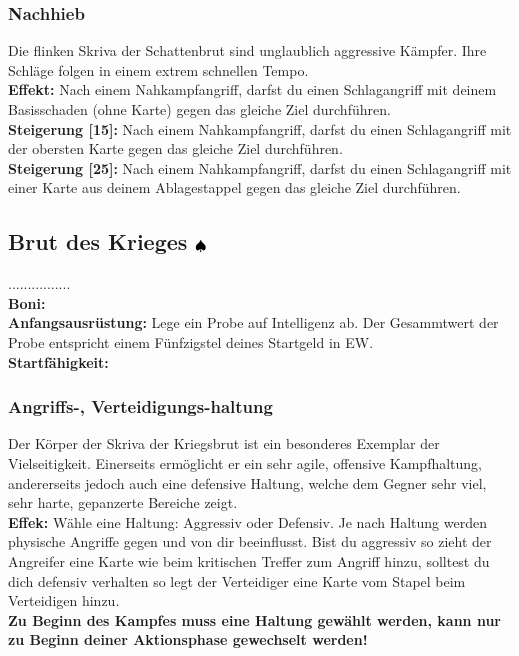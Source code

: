 \subsubsection*{Nachhieb} \label{sk:nachhieb}
Die flinken Skriva der Schattenbrut sind unglaublich aggressive Kämpfer. Ihre Schläge folgen in einem extrem schnellen Tempo. \\
\textbf{Effekt:} Nach einem Nahkampfangriff, darfst du einen Schlagangriff mit deinem Basisschaden (ohne Karte) gegen das gleiche Ziel durchführen.\\
\textbf{Steigerung [15]:} Nach einem Nahkampfangriff, darfst du einen Schlagangriff mit der obersten Karte gegen das gleiche Ziel durchführen.\\
\textbf{Steigerung [25]:} Nach einem Nahkampfangriff, darfst du einen Schlagangriff mit einer Karte aus deinem Ablagestappel gegen das gleiche Ziel durchführen.


\subsection*{Brut des Krieges ${\color{blue} }{\color{black}\spadesuit}$}
................\\
\textbf{Boni:} \\
\textbf{Anfangsausrüstung:} Lege ein Probe auf Intelligenz ab. Der Gesammtwert der Probe entspricht einem Fünfzigstel deines Startgeld in EW.\\
\textbf{Startfähigkeit:}  \\

\subsubsection*{Angriffs-, Verteidigungs-haltung} \label{sk:angriff_verteitigungs_haltung}
Der Körper der Skriva der Kriegsbrut ist ein besonderes Exemplar der Vielseitigkeit. Einerseits ermöglicht er ein sehr agile, offensive Kampfhaltung, andererseits jedoch auch eine defensive Haltung, welche dem Gegner sehr viel, sehr harte, gepanzerte Bereiche zeigt. \\
\textbf{Effek:} Wähle eine Haltung: Aggressiv oder Defensiv. Je nach Haltung werden physische Angriffe gegen und von dir beeinflusst. Bist du aggressiv so zieht der Angreifer eine Karte wie beim kritischen Treffer zum Angriff hinzu, solltest du dich defensiv verhalten so legt der Verteidiger eine Karte vom Stapel beim Verteidigen hinzu.\\
\textbf{Zu Beginn des Kampfes muss eine Haltung gewählt werden,
kann nur zu Beginn deiner Aktionsphase gewechselt werden!}


